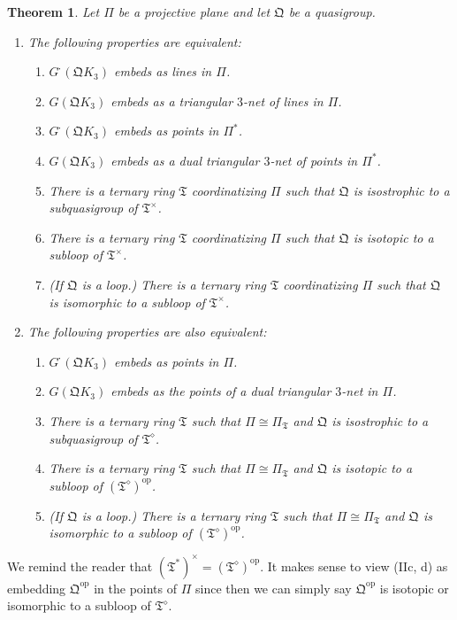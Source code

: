 \documentclass[reqno,12pt]{amsart}
\newtheorem{thm}{Theorem}[section]
\theoremstyle{remark}
\numberwithin{equation}{section}
\numberwithin{figure}{section}
\newcommand \full{^{{}^{{}_{{}_\bullet}}\!}}
\newcommand \opp{^\mathrm{op}}
\newcommand \fQ{\mathfrak Q}
\newcommand \fT{\mathfrak T}
\newcommand\PP{\Pi}	%
\newcommand\G{{G\full}}
\begin{document}
\begin{thm} \label{parte1}
Let $\PP$ be a projective plane and let $ \fQ$  be a quasigroup.  
\begin{enumerate}[{\rm (I)}]

\item The following properties are equivalent:
%
\begin{enumerate}[{\rm(a)}]
\item $\G(\fQ K_3)$ embeds as lines in $\PP$.
\item $G(\fQ K_3)$ embeds as a triangular $3$-net of lines in $\PP$.
\item $\G(\fQ K_3)$ embeds as points in $\PP^*$.
\item $G(\fQ K_3)$ embeds as a dual triangular $3$-net of points in $\PP^*$.
\item There is a ternary ring $\fT$ coordinatizing $\PP$ such that $\fQ$ is isostrophic to a subquasigroup of $\fT^\times$.
\item There is a ternary ring $\fT$ coordinatizing $\PP$ such that $\fQ$ is isotopic to a subloop of $\fT^\times$.
\item (If $\fQ$ is a loop.)  There is a ternary ring $\fT$ coordinatizing $\PP$ such that $\fQ$ is isomorphic to a subloop of $\fT^\times$.
\end{enumerate}
%

\item The following properties are also equivalent:
%
\begin{enumerate}[{\rm(a)}]
\item $\G(\fQ K_3)$ embeds as points in $\PP$.
\item $G(\fQ K_3)$ embeds as the points of a dual triangular $3$-net in $\PP$.
\item There is a ternary ring $\fT$ such that $\PP \cong \PP_\fT$ and $\fQ$ is isostrophic to a subquasigroup of $\fT^\diamond$.
\item There is a ternary ring $\fT$ such that $\PP \cong \PP_\fT$ and $\fQ$ is isotopic to a subloop of $(\fT^\diamond)\opp$.
\item (If $\fQ$ is a loop.)  There is a ternary ring $\fT$ such that $\PP \cong \PP_\fT$ and $\fQ$ is isomorphic to a subloop of $(\fT^\diamond)\opp$.
\end{enumerate}
%
\end{enumerate}
\end{thm}

We remind the reader that $(\fT^*)^\times = (\fT^\diamond)\opp$.  It makes sense to view (IIc, d) as embedding $\fQ\opp$ in the points of $\PP$ since then we can simply say $\fQ\opp$ is isotopic or isomorphic to a subloop of $\fT^\diamond$.
\end{document}
